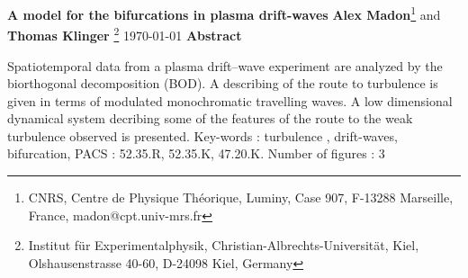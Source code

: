 

\def\listdesfig{
A01Hfour.eps
A06Hfour.eps
A02Hfour.eps
A07Hfour.eps
A03Hfour.eps
A08Hfour.eps
A04Hfour.eps
A09Hfour.eps
A05Hfour.eps
A10Hfour.eps
poidsforme.eps
lock.eps
}

\def\subfigureA#1{
\leavevmode
\hbox{#1}
}


\begin{titlepage}
\begin{center}
\vspace{2cm}
{\bf \large A model for the bifurcations in plasma drift-waves}
\vspace{0.3cm}
\setcounter{footnote}{0}
\renewcommand{\thefootnote}{\arabic{footnote}}
{\bf Alex Madon}\footnote{CNRS, Centre de Physique Th\'eorique, Luminy,
         Case 907, F-13288 Marseille, France, 
         madon@cpt.univ-mrs.fr}
and {\bf Thomas Klinger}
\footnote{Institut f\"ur Experimentalphysik, 
Christian-Albrechts-Universit\"at,
         Kiel, Olshausenstrasse 40-60, D-24098 Kiel, Germany}
%
\today
\vspace{3cm}
{\bf Abstract}
\end{center}
Spatiotemporal data from a plasma drift--wave experiment are analyzed
by the biorthogonal decomposition (BOD). A describing of the route
to turbulence is given in terms of  modulated monochromatic 
travelling waves.
A low dimensional dynamical system decribing some of the features 
of the route to the weak turbulence observed is presented.
\vspace{3 cm}
Key-words : turbulence , drift-waves, 
bifurcation,
PACS : 52.35.R, 52.35.K, 47.20.K.
\vspace{2 cm}
\noindent Number of figures : 3
\end{titlepage}




